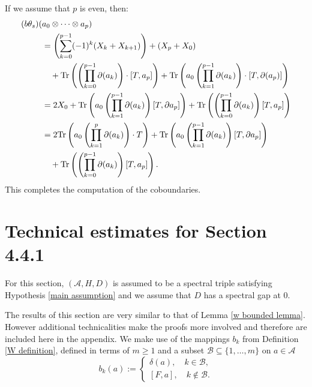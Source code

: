     If we assume that $p$ is even, then:
    \begin{align*}
        (b\theta_s)(&a_0\otimes\cdots\otimes a_p)\\
                    &= \left(\sum_{k=0}^{p-1}(-1)^k(X_k+X_{k+1})\right)+(X_p+X_0)\\
                    &\quad +{\rm Tr}\left(\left(\prod_{k=0}^{p-1}\partial(a_k)\right)\cdot [T,a_p]\right)+{\rm Tr}\left(a_0\left(\prod_{k=1}^{p-1}\partial(a_k)\right)\cdot [T,\partial(a_p)]\right)\\
                    &= 2X_0+{\rm Tr}\left(a_0\left(\prod_{k=1}^{p-1}\partial(a_k)\right) [T,\partial a_p]\right) +{\rm Tr}\left(\left(\prod_{k=0}^{p-1}\partial(a_k)\right)[T,a_p]\right)\\
                    &= 2{\rm Tr}\left(a_0\left(\prod_{k=1}^p\partial(a_k)\right)\cdot T\right)+{\rm Tr}\left(a_0\left(\prod_{k=1}^{p-1}\partial(a_k)\right) [T,\partial a_p]\right)\\
                    &\quad+{\rm Tr}\left(\left(\prod_{k=0}^{p-1}\partial(a_k)\right)[T,a_p]\right).
    \end{align*}
    This completes the computation of the coboundaries.

\section{Technical estimates for Section 4.4.1}\label{app 3 section}

    For this section, $(\mathcal{A},H,D)$ is assumed to be a spectral triple satisfying Hypothesis \ref{main assumption} and we
    assume that $D$ has a spectral gap at $0$.

    The results of this section are very similar to that of Lemma \ref{w bounded lemma}. However additional technicalities make the proofs more involved and therefore are included here in the appendix.
    We make use of the mappings $b_k$ from Definition \ref{W definition}, defined in terms of $m\geq 1$ and a subset $\mathscr{B} \subseteq \{1,\ldots,m\}$ on $a \in \mathcal{A}$
    \begin{equation*}
        b_k(a) := \begin{cases}
                      \delta(a),\quad k \in \mathscr{B},\\
                      [F,a],\quad k\notin \mathscr{B}.
                  \end{cases}
    \end{equation*}
        

